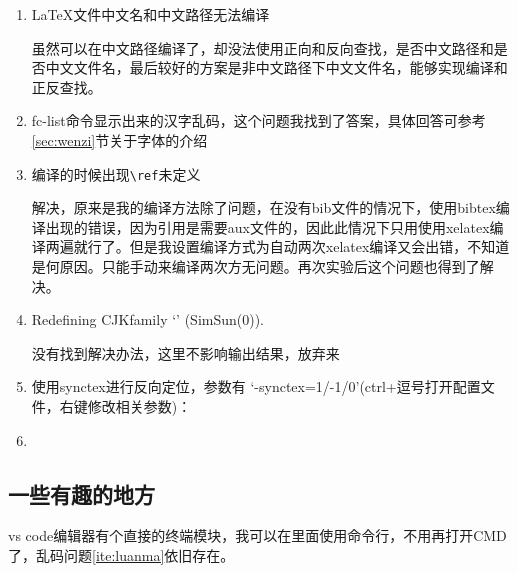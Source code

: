 \begin{enumerate}
\item \LaTeX 文件中文名和中文路径无法编译

虽然可以在中文路径编译了，却没法使用正向和反向查找，是否中文路径和是否中文文件名，最后较好的方案是非中文路径下中文文件名，能够实现编译和正反查找。

\item fc-list命令显示出来的汉字乱码\label{ite:luanma}，这个问题我找到了答案，具体回答可参考\ref{sec:wenzi}节关于字体的介绍

\item 编译的时候出现\verb|\ref|未定义

解决，原来是我的编译方法除了问题，在没有bib文件的情况下，使用bibtex编译出现的错误，因为引用是需要aux文件的，因此此情况下只用使用xelatex编译两遍就行了。但是我设置编译方式为自动两次xelatex编译又会出错，不知道是何原因。只能手动来编译两次方无问题。再次实验后这个问题也得到了解决。

\item Redefining CJKfamily `\CJKrmdefault' (SimSun(0)).

没有找到解决办法，这里不影响输出结果，放弃来
\item 使用synctex进行反向定位，参数有 `-synctex=1/-1/0’(ctrl+逗号打开配置文件，右键修改相关参数)：
\item 
\end{enumerate}

\subsection{一些有趣的地方}

vs code编辑器有个直接的终端模块，我可以在里面使用命令行，不用再打开CMD了，乱码问题\ref{ite:luanma}依旧存在。




